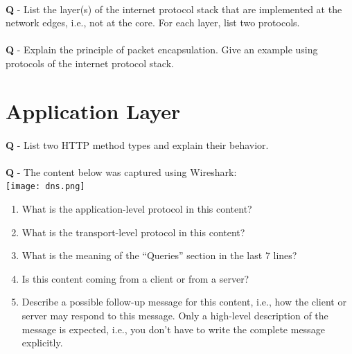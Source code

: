 \documentclass{llncs}
\newcounter{ques}
\renewcommand{\question}[1]{\paragraph{}\textbf{Q\theques} - #1\stepcounter{ques} }
\newcommand{\answer}[1]{}%
\begin{document}

\question{List the layer(s) of the internet protocol stack that are implemented
  at the network edges, i.e., not at the core. For each layer, list
  two protocols.}

\answer{
\begin{itemize}
\item Application: HTTP, SMTP.
\item Transport: TCP, UDP. 
\end{itemize}
}

\newpage

\question{Explain the principle of packet encapsulation. Give an
  example using protocols of the internet protocol stack. }

\answer{ Packet encapsulation is the process according to which the
  packet produced by layer $n-1$ is formed by appending a header and
  possibly a trailer to the packet produced at layer $n$.  For
  instance, the IP header is appended to a TCP segment to form an IP
  datagram.}

\newpage

\section{Application Layer}


\question{List two HTTP method types and explain their behavior.}

\answer{
  \begin{itemize}
  \item GET: get the content at a URL.
  \item POST: send data to a URL.
  \item HEAD: get the header lines only, not the requested object.
  \end{itemize}
}

\newpage

\question{The content below was captured using
  Wireshark:\\
  
\texttt{[image: dns.png]}

\begin{enumerate}
\item What is the application-level protocol in this content?
\item What is the transport-level protocol in this content?
\item What is the meaning of the ``Queries'' section in the last 7 lines? 
\item Is this content coming from a client or from a server?
\item Describe a possible follow-up message for this content, i.e.,
  how the client or server may respond to this message. Only a
  high-level description of the message is expected, i.e., you don't
  have to write the complete message explicitly.
\end{enumerate}
}
\end{document}
